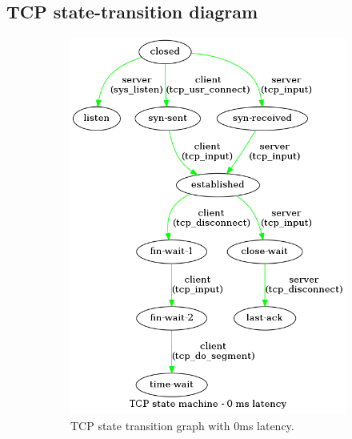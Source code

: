 \documentclass[a4paper,10pt]{article}
\begin{document}
\subsection{TCP state-transition diagram}
\begin{figure}[]
\begin{subfigure}{.25\textwidth}
    \centering
    \includegraphics[width=\textwidth]{images/TCP_state_machine_0_ms.png}
    \caption{TCP state transition graph with 0ms latency.}
    \label{fig:0ms_latency}
\end{subfigure}%
\qquad
\begin{subfigure}{.25\textwidth}
   \centering

\end{subfigure}
\end{figure}
\end{document}
